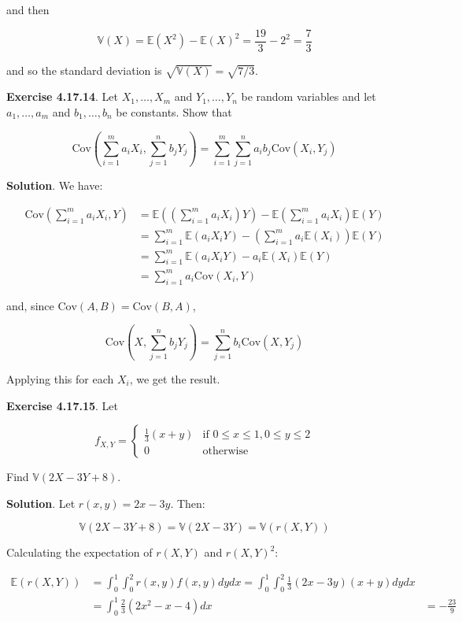 and then

\[ \mathbb{V}(X) = \mathbb{E}(X^{2}) - \mathbb{E}(X)^{2} = \frac{19}{3} - 2^{2} = \frac{7}{3} \]

and so the standard deviation is \(\sqrt{\mathbb{V}(X)} = \sqrt{7/3}\).

\textbf{Exercise 4.17.14}. Let \(X_{1}, \dots, X_m\) and
\(Y_{1}, \dots, Y_{n}\) be random variables and let \(a_{1}, \dots, a_m\) and
\(b_{1}, \dots, b_{n}\) be constants. Show that

\[ \text{Cov}\left( \sum_{i=1}^m a_{i} X_{i} , \sum_{j=1}^{n} b_{j} Y_{j} \right) = \sum_{i=1}^m \sum_{j=1}^{n} a_{i} b_{j} \text{Cov}(X_{i}, Y_{j}) \]

\textbf{Solution}. We have:

\begin{align*}
\text{Cov}\left(\sum_{i=1}^m a_{i} X_{i}, Y\right) &= \mathbb{E}\left(\left( \sum_{i=1}^m a_{i} X_{i} \right) Y\right) - \mathbb{E}\left( \sum_{i=1}^m a_{i} X_{i} \right) \mathbb{E}(Y) \\
&= \sum_{i=1}^m \mathbb{E}(a_{i} X_{i} Y) - \left( \sum_{i=1}^m a_{i} \mathbb{E}(X_{i}) \right) \mathbb{E}(Y) \\
&= \sum_{i=1}^m \mathbb{E}(a_{i} X_{i} Y) -  a_{i} \mathbb{E}(X_{i}) \mathbb{E}(Y) \\
&= \sum_{i=1}^m a_{i} \text{Cov}(X_{i}, Y)
\end{align*}

and, since \(\text{Cov}(A, B) = \text{Cov}(B, A)\),

\[ \text{Cov}\left(X, \sum_{j=1}^{n} b_{j} Y_{j} \right) = \sum_{j=1}^{n} b_{i} \text{Cov}(X, Y_{j}) \]

Applying this for each \(X_{i}\), we get the result.

\textbf{Exercise 4.17.15}. Let

\[ f_{X, Y} = \begin{cases}
\frac{1}{3} (x + y) &\text{if } 0 \leq x \leq 1, 0 \leq y \leq 2 \\
0 &\text{otherwise}
\end{cases}\]

Find \(\mathbb{V}(2X - 3Y + 8)\).

\textbf{Solution}. Let \(r(x, y) = 2x - 3y\). Then:

\[ \mathbb{V}(2X - 3Y + 8) = \mathbb{V}(2X - 3Y) = \mathbb{V}(r(X, Y)) \]

Calculating the expectation of \(r(X, Y)\) and \(r(X, Y)^{2}\):

\begin{align*}
\mathbb{E}(r(X, Y)) 
& = \int_{0}^{1} \int_{0}^{2} r(x, y) f(x, y) dy dx 
  = \int_{0}^{1} \int_{0}^{2} \frac{1}{3}(2x - 3y)(x + y) dy dx 
\\
& = \int_{0}^{1} \frac{2}{3}(2x^{2} - x - 4) dx 
& = -\frac{23}{9}
\end{align*}

